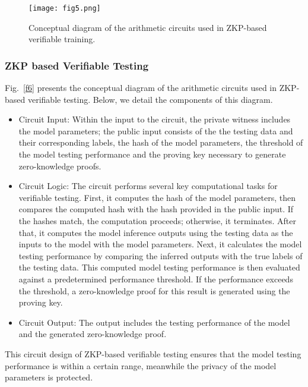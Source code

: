 \documentclass[journal]{IEEEtran}
\begin{document}
\begin{figure*}[!t]
    \centering
    \texttt{[image: fig5.png]}
    \caption{Conceptual diagram of the arithmetic circuits used in ZKP-based verifiable training.}
    \label{f5}
\end{figure*}


\subsubsection{\bf ZKP based Verifiable Testing} Fig.~\ref{f6} presents the conceptual diagram of the arithmetic circuits used in ZKP-based verifiable testing. Below, we detail the components of this diagram. 



\begin{itemize}


\item {Circuit Input}: Within the input to the circuit, the private witness includes the model parameters; the public input consists of the the testing data and their corresponding labels, the hash of the model parameters, the threshold of the model testing performance and the proving key necessary to generate zero-knowledge proofs.

\item {Circuit Logic}: The circuit performs several key computational tasks for verifiable testing. First, it computes the hash of the model parameters, then compares the computed hash with the hash provided in the public input. If the hashes match, the computation proceeds; otherwise, it terminates. After that, it computes the model inference outputs using the testing data as the inputs to the model with the model parameters. Next, it calculates the model testing performance by comparing the inferred outputs with the true labels of the testing data. This computed model testing performance is then evaluated against a predetermined performance threshold. If the performance exceeds the threshold, a zero-knowledge proof for this result is generated using the proving key.

\item {Circuit Output}: The output includes the testing performance of the model and the generated zero-knowledge proof. 


\end{itemize}

This circuit design of ZKP-based verifiable testing ensures that
the model testing performance is within a certain range, meanwhile the privacy of the model parameters is protected. 
\end{document}
